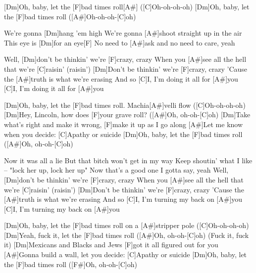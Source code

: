 

\begin{guitar}
	[Dm]Oh, baby, let the [F]bad times roll[A#] ([C]Oh-oh-oh-oh)
	[Dm]Oh, baby, let the [F]bad times roll ([A#]Oh-oh-oh-[C]oh)
	
	We're gonna [Dm]hang 'em high
	We’re gonna [A#]shoot straight up in the air
	This eye is [Dm]for an eye[F]{}
	No need to [A#]ask and no need to care, yeah
	
	Well, [Dm]don't be thinkin' we're [F]crazy, crazy
	When you [A#]see all the hell that we're [C]raisin' (raisin')
	[Dm]Don't be thinkin' we're [F]crazy, crazy
	'Cause the [A#]truth is what we're erasing
	And so [C]I, I’m doing it all for [A#]you
	[C]I, I'm doing it all for [A#]you
	
	\begin{highlightbar}
		[Dm]Oh, baby, let the [F]bad times roll. Machia[A#]velli flow ([C]Oh-oh-oh-oh)
		[Dm]Hey, Lincoln, how does [F]your grave roll? ([A#]Oh, oh-oh-[C]oh)
		[Dm]Take what’s right and make it wrong, [F]make it up as I go along
		[A#]Let me know when you decide: [C]Apathy or suicide
		[Dm]Oh, baby, let the [F]bad times roll ([A#]Oh, oh-oh-[C]oh)
	\end{highlightbar}
	
	\songsection{Verse 2}
	Now it was all a lie
	But that bitch won’t get in my way
	Keep shoutin’ what I like – "lock her up, lock her up"
	Now that’s a good one I gotta say, yeah
	\pagebreak
	\songsection{Pre-Chorus 2}
	Well, [Dm]don't be thinkin' we're [F]crazy, crazy
	When you [A#]see all the hell that we're [C]raisin' (raisin')
	[Dm]Don't be thinkin' we're [F]crazy, crazy
	'Cause the [A#]truth is what we're erasing
	And so [C]I, I’m turning my back on [A#]you
	[C]I, I’m turning my back on [A#]you
	
	\begin{highlightbar}
		\songsection{Chorus 2}
		[Dm]Oh, baby, let the [F]bad times roll on a [A#]stripper pole ([C]Oh-oh-oh-oh)
		[Dm]Yeah, fuck it, let the [F]bad times roll ([A#]Oh, oh-oh-[C]oh) (Fuck it, fuck it)
		[Dm]Mexicans and Blacks and Jews [F]got it all figured out for you
		[A#]Gonna build a wall, let you decide: [C]Apathy or suicide
		[Dm]Oh, baby, let the [F]bad times roll ([F#]Oh, oh-oh-[C]oh)
	\end{highlightbar}
	

\end{guitar}
